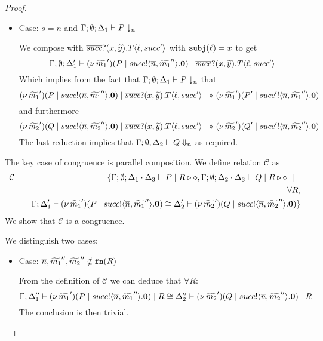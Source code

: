 \begin{proof}
\begin{itemize}
	\item Case: $s = n$ and $\Gamma; \emptyset; \Delta_1 \vdash P \downarrow_{n}$

	\noi We compose with $\overline{succ} ? (x, \widetilde{y}) . T\langle \ell, succ' \rangle$ with $\mathtt{subj}(\ell) = x$ to get
%
	\[
		\Gamma; \emptyset; \Delta_1' \vdash (\nu\, \widetilde{m_1}')(P \;|\; succ ! \langle \overline{n}, \widetilde{m_1}'' \rangle . \mathbf{0}) \;|\; \overline{succ} ? (x, \widetilde{y}) . T\langle \ell, succ' \rangle
	\]
%
	\noi Which implies from the fact that $\Gamma; \emptyset; \Delta_1 \vdash P \downarrow_{n}$ that
%
	\[
		(\nu\, \widetilde{m_1}')(P \;|\; succ ! \langle \overline{n}, \widetilde{m_1}'' \rangle . \mathbf{0}) \;|\; \overline{succ} ? (x, \widetilde{y}) . T\langle \ell, succ' \rangle \rightarrow\!\!\!\!\!\rightarrow 
		(\nu\, \widetilde{m_1}')(P' \;|\; succ' ! \langle \overline{n}, \widetilde{m_1}'' \rangle . \mathbf{0})
	\]
%
	\noi and furthermore
%
	\[
		(\nu\, \widetilde{m_2}')(Q \;|\; succ ! \langle \overline{n}, \widetilde{m_2}'' \rangle . \mathbf{0}) \;|\; \overline{succ} ? (x, \widetilde{y}) . T\langle \ell, succ' \rangle \rightarrow\!\!\!\!\!\rightarrow 
		(\nu\, \widetilde{m_2}')(Q' \;|\; succ' ! \langle \overline{n}, \widetilde{m_2}'' \rangle . \mathbf{0})
	\]
%
	\noi The last reduction implies that
	$\Gamma; \emptyset; \Delta_2 \vdash Q \Downarrow_{n}$ as required.
    \end{itemize}
    
	The key case of congruence is parallel composition.
	We define relation $\mathcal{C}$ as
%
	\begin{eqnarray*}
		\mathcal{C} &=&	\{ \Gamma; \emptyset; \Delta_1 \cdot \Delta_3 \vdash P \;|\; R \triangleright \diamond,  \Gamma; \emptyset; \Delta_2 \cdot \Delta_3 \vdash Q \;|\; R \triangleright \diamond \ \ |\ \  \\
		& &	\forall R,\\
		& &	\Gamma; \Delta_1' \vdash (\nu\, \widetilde{m_1}')(P \;|\; succ ! \langle \overline{n}, \widetilde{m_1}'' \rangle . \mathbf{0}) \cong \Delta_2' \vdash (\nu\, \widetilde{m_2}')(Q \;|\; succ ! \langle \overline{n}, \widetilde{m_2}'' \rangle . \mathbf{0})\}
	\end{eqnarray*}
%
	\noi We show that $\mathcal{C}$ is a congruence.

	\noi We distinguish two cases:
        \begin{itemize}
	\item Case: $\overline{n}, \widetilde{m_1}'', \widetilde{m_2}'' \notin \mathtt{fn}(R)$	

	\noi From the definition of $\mathcal{C}$ we can deduce that $\forall R$:
%
	\[
		\Gamma; \Delta_1'' \vdash (\nu\, \widetilde{m_1}')(P \;|\; succ ! \langle \overline{n}, \widetilde{m_1}'' \rangle . \mathbf{0}) \;|\; R \cong \Delta_2'' \vdash (\nu\, \widetilde{m_2}')(Q \;|\; succ ! \langle \overline{n}, \widetilde{m_2}'' \rangle . \mathbf{0}) \;|\; R
	\]
	\noi The conclusion is then trivial.


\end{itemize}
\end{proof}
